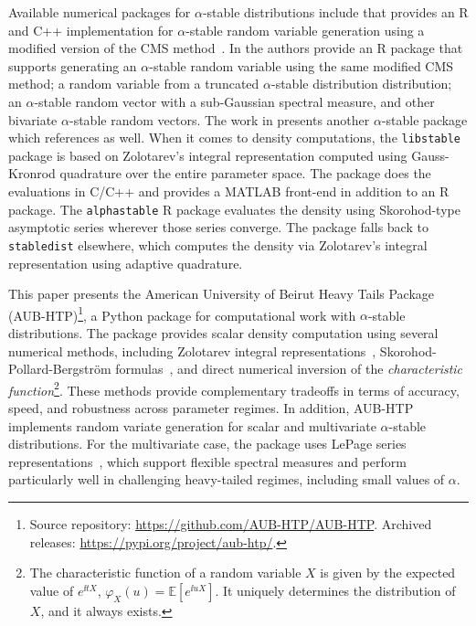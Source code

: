 Available numerical packages for $\alpha$-stable distributions include \cite{Royuela-del-ValJavier2017l:FP} that provides an R and C++ implementation for $\alpha$-stable random variable generation using a modified version of the CMS method~\cite{ChambersJ.M.1976AMfS,NolanJohnP2020USDM}. In \cite{teimouri2018alphastablerpackagemodelling} the authors provide an R package that supports generating an $\alpha$-stable random variable using the same modified CMS method; a random variable from a truncated $\alpha$-stable distribution distribution; an $\alpha$-stable random vector with a sub-Gaussian spectral measure, and other bivariate $\alpha$-stable random vectors. The work in \cite{RJ-2022-056} presents another $\alpha$-stable package which references \cite{teimouri2018alphastablerpackagemodelling} as well. When it comes to density computations, the \texttt{libstable} package \cite{Royuela-del-ValJavier2017l:FP} is based on Zolotarev's integral representation \cite{Zolotarev1986} computed using Gauss-Kronrod quadrature over the entire parameter space. The package does the evaluations in C/C++ and provides a MATLAB front-end in addition to an R package. The \texttt{alphastable} R package \cite{teimouri2018alphastablerpackagemodelling} evaluates the density using Skorohod-type asymptotic series \cite{sko2,Pollard1946LaplaceIntegral,Bergstrom1952ExpansionsStable} wherever those series converge. The package falls back to \texttt{stabledist} \cite{Wuertz2016Stabledist} elsewhere, which computes the density via Zolotarev's integral representation \cite{Zolotarev1986} using adaptive quadrature.

This paper presents the American University of Beirut Heavy Tails Package (AUB-HTP)\footnote{Source repository: \url{https://github.com/AUB-HTP/AUB-HTP}. Archived releases: \url{https://pypi.org/project/aub-htp/}.}, a Python package for computational work with $\alpha$-stable distributions. The package provides scalar density computation using several numerical methods, including Zolotarev integral representations~\cite{Zolotarev1986}, Skorohod-Pollard-Bergstr{\"o}m formulas~\cite{sko2,Pollard1946LaplaceIntegral,Bergstrom1952ExpansionsStable}, and direct numerical inversion of the \textit{characteristic function}\footnote{The characteristic function of a random variable $X$ is given by the expected value of $e^{\ii tX}$,
\(
\varphi_X(u) = \mathbb{E}[e^{\ii uX}].
\)
It uniquely determines the distribution of $X$, and it always exists.}. These methods provide complementary tradeoffs in terms of accuracy, speed, and robustness across parameter regimes. In addition, AUB-HTP implements random variate generation for scalar and multivariate $\alpha$-stable distributions. For the multivariate case, the package uses LePage series representations~\cite{LePageRaoul1981CtaS}, which support flexible spectral measures and perform particularly well in challenging heavy-tailed regimes, including small values of $\alpha$.

